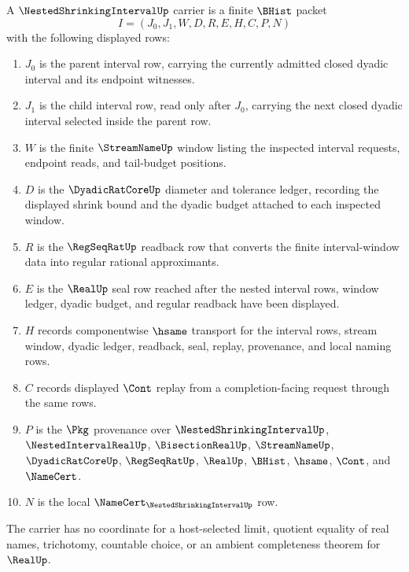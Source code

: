 \begin{definition}
\label{def:nested-shrinking-interval-carrier}
A $\NestedShrinkingIntervalUp$ carrier is a finite $\BHist$ packet
$$
I=(J_0,J_1,W,D,R,E,H,C,P,N)
$$
with the following displayed rows:
\begin{enumerate}
\item $J_0$ is the parent interval row, carrying the currently admitted closed dyadic interval and its endpoint witnesses.
\item $J_1$ is the child interval row, read only after $J_0$, carrying the next closed dyadic interval selected inside the parent row.
\item $W$ is the finite $\StreamNameUp$ window listing the inspected interval requests, endpoint reads, and tail-budget positions.
\item $D$ is the $\DyadicRatCoreUp$ diameter and tolerance ledger, recording the displayed shrink bound and the dyadic budget attached to each inspected window.
\item $R$ is the $\RegSeqRatUp$ readback row that converts the finite interval-window data into regular rational approximants.
\item $E$ is the $\RealUp$ seal row reached after the nested interval rows, window ledger, dyadic budget, and regular readback have been displayed.
\item $H$ records componentwise $\hsame$ transport for the interval rows, stream window, dyadic ledger, readback, seal, replay, provenance, and local naming rows.
\item $C$ records displayed $\Cont$ replay from a completion-facing request through the same rows.
\item $P$ is the $\Pkg$ provenance over $\NestedShrinkingIntervalUp$, $\NestedIntervalRealUp$, $\BisectionRealUp$, $\StreamNameUp$, $\DyadicRatCoreUp$, $\RegSeqRatUp$, $\RealUp$, $\BHist$, $\hsame$, $\Cont$, and $\NameCert$.
\item $N$ is the local $\NameCert_{\NestedShrinkingIntervalUp}$ row.
\end{enumerate}
The carrier has no coordinate for a host-selected limit, quotient equality of real names, trichotomy, countable choice, or an ambient completeness theorem for $\RealUp$.
\end{definition}


